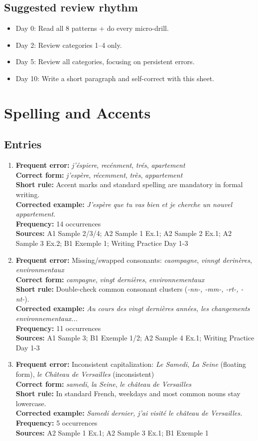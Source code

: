 \documentclass{article}
\newcommand{\mistakeentry}[6]{
\item \textbf{Frequent error:} #1\\
\textbf{Correct form:} #2\\
\textbf{Short rule:} #3\\
\textbf{Corrected example:} #4\\
\textbf{Frequency:} #5\\
\textbf{Sources:} #6
}
\begin{document}
\subsection*{Suggested review rhythm}
\begin{itemize}
    \item Day 0: Read all 8 patterns + do every micro-drill.
    \item Day 2: Review categories 1--4 only.
    \item Day 5: Review all categories, focusing on persistent errors.
    \item Day 10: Write a short paragraph and self-correct with this sheet.
\end{itemize}

\section{Spelling and Accents}
\subsection*{Entries}
\begin{enumerate}
    \mistakeentry
    {\textit{j'éspiere}, \textit{recénment}, \textit{trés}, \textit{apartement}}
    {\textit{j'espère}, \textit{récemment}, \textit{très}, \textit{appartement}}
    {Accent marks and standard spelling are mandatory in formal writing.}
    {\textit{J'espère que tu vas bien et je cherche un nouvel appartement.}}
    {14 occurrences}
    {A1 Sample 2/3/4; A2 Sample 1 Ex.1; A2 Sample 2 Ex.1; A2 Sample 3 Ex.2; B1 Exemple 1; Writing Practice Day 1-3}

    \mistakeentry
    {Missing/swapped consonants: \textit{caompagne}, \textit{vinngt derinères}, \textit{environmentaux}}
    {\textit{campagne}, \textit{vingt dernières}, \textit{environnementaux}}
    {Double-check common consonant clusters (\textit{-nn-, -mm-, -rt-, -nt-}).}
    {\textit{Au cours des vingt dernières années, les changements environnementaux...}}
    {11 occurrences}
    {A1 Sample 3; B1 Exemple 1/2; A2 Sample 4 Ex.1; Writing Practice Day 1-3}

    \mistakeentry
    {Inconsistent capitalization: \textit{Le Samedi}, \textit{La Seine} (floating form), \textit{le Château de Versailles} (inconsistent)}
    {\textit{samedi}, \textit{la Seine}, \textit{le château de Versailles}}
    {In standard French, weekdays and most common nouns stay lowercase.}
    {\textit{Samedi dernier, j'ai visité le château de Versailles.}}
    {5 occurrences}
    {A2 Sample 1 Ex.1; A2 Sample 3 Ex.1; B1 Exemple 1}
\end{enumerate}
\end{document}
